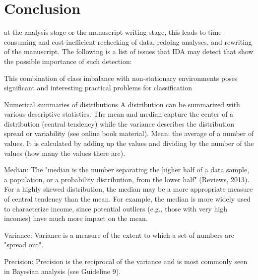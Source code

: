 \chapter{Conclusion}\label{Sec:Conclusion}


at the analysis stage or the manuscript writing stage, this leads to time-consuming and cost-inefficient rechecking of data, redoing analyses, and rewriting of the manuscript. The following is a list of issues that IDA may detect that show the possible importance of such detection:

This combination of class imbalance with non-stationary environments poses signiﬁcant and interesting practical problems for classiﬁcation


Numerical summaries of distributions
A distribution can be summarized with various descriptive statistics. The mean and median capture the center of a distribution (central tendency) while the variance describes the distribution spread or variability (see online book material).  
Mean: the average of a number of values. It is calculated by adding up the values and dividing by the number of the values (how many the values there are). 

Median: The "median is the number separating the higher half of a data sample, a population, or a probability distribution, from the lower half" (Reviews, 2013). For a highly skewed distribution, the median may be a more appropriate measure of central tendency than the mean. For example, the median is more widely used to characterize income, since potential outliers (e.g., those with very high incomes) have much more impact on the mean.
 
Variance: Variance is a measure of the extent to which a set of numbers are "spread out".

Precision: Precision is the reciprocal of the variance and is most commonly seen in Bayesian analysis (see Guideline 9).
